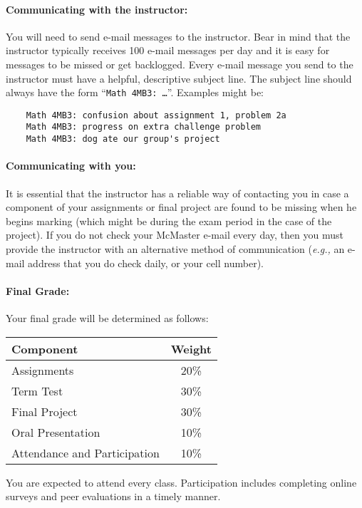 \documentclass[12pt]{article}
\begin{document}
\paragraph*{Communicating with the instructor:}

You will need to send e-mail messages to the instructor.  Bear in mind that the instructor typically receives 100 e-mail messages per day and it is easy for messages to be missed or get backlogged.  Every e-mail message you send to the instructor must have a helpful, descriptive subject line.  The subject line should always have the form ``{\tt Math 4MB3: \dots}''.  Examples might be:
\begin{verbatim}
    Math 4MB3: confusion about assignment 1, problem 2a
    Math 4MB3: progress on extra challenge problem
    Math 4MB3: dog ate our group's project
\end{verbatim}

\paragraph*{Communicating with you:}

It is essential that the instructor has a reliable way of contacting you in case a component of your assignments or final project are found to be missing when he begins marking (which might be during the exam period in the case of the project).  If you do not check your McMaster e-mail every day, then you must provide the instructor with an alternative method of communication (\emph{e.g.,} an e-mail address that you do check daily, or your cell number).

\paragraph*{Final Grade:}
Your final grade will be determined as follows:
%
\begin{center}
\begin{tabular}{l|c}
\bf Component & \bf Weight \\\hline
Assignments & 20\% \\
Term Test & 30\% \\
Final Project & 30\% \\
Oral Presentation & 10\% \\
Attendance and Participation & 10\% \\
\end{tabular}
\end{center}
\noindent You are expected to attend every class.  Participation
includes completing online surveys and peer evaluations in a timely
manner.
\end{document}
